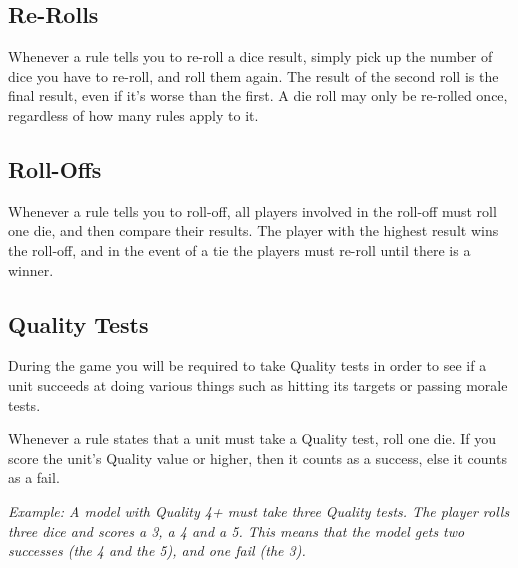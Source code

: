 \documentclass[9pt, a4paper]{extarticle}            %
\begin{document}
\begin{multicols}{2}
\subsection{Re-Rolls}

Whenever a rule tells you to re-roll a dice result, simply pick up the number of dice you have to re-roll, and roll them again. The result of the second roll is the final result, even if it’s worse than the first. A die roll may only be re-rolled once, regardless of how many rules apply to it.

\subsection{Roll-Offs}

Whenever a rule tells you to roll-off, all players involved in the roll-off must roll one die, and then compare their results. The player with the highest result wins the roll-off, and in the event of a tie the players must re-roll until there is a winner.

\subsection{Quality Tests}

During the game you will be required to take Quality tests in order to see if a unit succeeds at doing various things such as hitting its targets or passing morale tests.

Whenever a rule states that a unit must take a Quality test, roll one die. If you score the unit’s Quality value or higher, then it counts as a success, else it counts as a fail.

\textit{Example: A model with Quality 4+ must take three Quality tests. The player rolls three dice and scores a 3, a 4 and a 5. This means that the model gets two successes (the 4 and the 5), and one fail (the 3).}

\end{multicols}


\newpage


\end{document}
